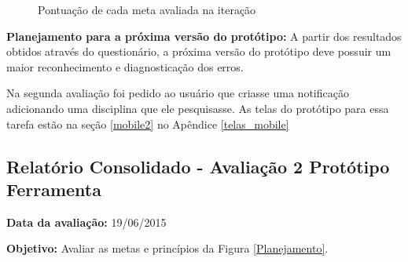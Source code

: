   \begin{figure}[h!]
  \centering
    \caption{Pontuação de cada meta avaliada na iteração}
    \label{fig:grafico1}
\end{figure}

  \textbf{Planejamento para a próxima versão do protótipo:}
  A partir dos resultados obtidos através do questionário, a próxima versão do protótipo deve possuir um maior reconhecimento e diagnosticação
  dos erros.

  \vfill
  \pagebreak

  Na segunda avaliação foi pedido ao usuário que criasse uma notificação adicionando uma disciplina que ele pesquisasse. As telas do protótipo para essa tarefa
estão na seção \ref{mobile2} no Apêndice \ref{telas_mobile}

  \subsection{Relatório Consolidado - Avaliação 2 Protótipo Ferramenta}

  \flushleft \textbf{Data da avaliação:} 
  19/06/2015

  \textbf{Objetivo:}
  Avaliar as metas e princípios da Figura \ref{Planejamento}.

